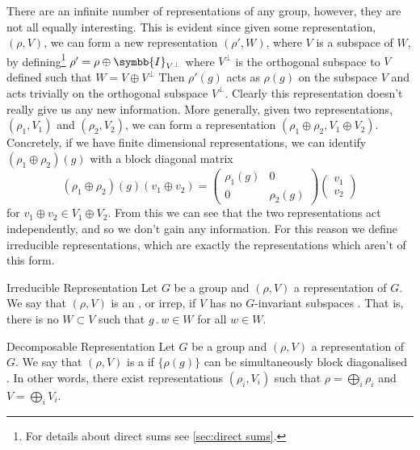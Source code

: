 \documentclass[fleqn]{NotesClass}
\newcommand{\identityMatrix}{\symbb{I}}
\newcommand{\action}{\mathbin{.}}
\begin{document}
    There are an infinite number of representations of any group, however, they are not all equally interesting.
    This is evident since given some representation, \((\rho, V)\), we can form a new representation \((\rho', W)\), where \(V\) is a subspace of \(W\), by defining\footnote{For details about direct sums see \cref{sec:direct sums}.} \(\rho' = \rho \oplus \identityMatrix_{V^\perp}\) where \(V^{\perp}\) is the orthogonal subspace to \(V\) defined such that \(W = V \oplus V^{\perp}\)
    Then \(\rho'(g)\) acts as \(\rho(g)\) on the subspace \(V\) and acts trivially on the orthogonal subspace \(V^{\perp}\).
    Clearly this representation doesn't really give us any new information.
    More generally, given two representations, \((\rho_1, V_1)\) and \((\rho_2, V_2)\), we can form a representation \((\rho_1 \oplus \rho_2, V_1 \oplus V_2)\).
    Concretely, if we have finite dimensional representations, we can identify \((\rho_1 \oplus \rho_2)(g)\) with a block diagonal matrix
    \begin{equation}
        (\rho_1 \oplus \rho_2)(g)(v_1 \oplus v_2) = 
        \begin{pmatrix}
            \rho_1(g) & 0\\
            0 & \rho_2(g)
        \end{pmatrix}
        \begin{pmatrix}
            v_1\\ v_2
        \end{pmatrix}
    \end{equation}
    for \(v_1 \oplus v_2 \in V_1 \oplus V_2\).
    From this we can see that the two representations act independently, and so we don't gain any information.
    For this reason we define irreducible representations, which are exactly the representations which aren't of this form.
    
    \begin{dfn}{Irreducible Representation}{}
        Let \(G\) be a group and \((\rho, V)\) a representation of \(G\).
        We say that \((\rho, V)\) is an , or irrep, if \(V\) has no \(G\)-invariant subspaces \cite[95]{hamermesh}.
        That is, there is no \(W \subset V\) such that \(g \action w \in W\) for all \(w \in W\).
    \end{dfn}

    \begin{dfn}{Decomposable Representation}{}
        Let \(G\) be a group and \((\rho, V)\) a representation of \(G\).
        We say that \((\rho, V)\) is a  if \(\{\rho(g)\}\) can be simultaneously block diagonalised \cite[97]{hamermesh}.
        In other words, there exist representations \((\rho_i, V_i)\) such that \(\rho = \bigoplus_i \rho_i\) and \(V = \bigoplus_i V_i\).
    \end{dfn}
    
\end{document}
